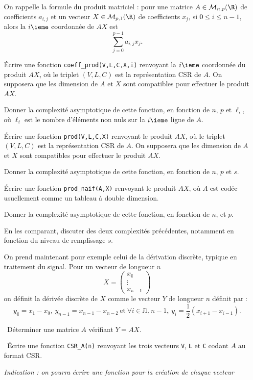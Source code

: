 \bigskip{}

On rappelle la formule du produit matriciel : pour une matrice $A \in \mathcal{M}_{n,p}(\R)$ de coefficients $a_{i,j}$ et un vecteur $X \in \mathcal{M}_{p,1}(\R)$ de coefficients $x_j$, si $0 \leq i \leq n-1$, alors la $i\ieme$ coordonnée de $AX$ est 
\begin{equation*}
    \sum_{j=0}^{p-1} a_{i,j} x_j.
\end{equation*}

\bigskip{}

\question{} Écrire une fonction \texttt{coeff\_prod(V,L,C,X,i)} renvoyant la $i\ieme$ coordonnée du produit $AX$, où le triplet $(V,L,C)$ est la représentation CSR de $A$. 
On supposera que les dimension de $A$ et $X$ sont compatibles pour effectuer le produit $AX$.

Donner la complexité asymptotique de cette fonction, en fonction de $n$, $p$ et $\ell_i$, où $\ell_i$ est le nombre d'éléments non nuls sur la $i\ieme$ ligne de $A$. 

\question{} Écrire une fonction \texttt{prod(V,L,C,X)} renvoyant le produit $AX$, où le triplet $(V,L,C)$ est la représentation CSR de $A$.  
On supposera que les dimension de $A$ et $X$ sont compatibles pour effectuer le produit $AX$.

Donner la complexité asymptotique de cette fonction, en fonction de $n$, $p$ et $s$. 

\question{} Écrire une fonction \texttt{prod\_naif(A,X)} renvoyant le produit $AX$, où $A$ est codée usuellement comme un tableau à double dimension.  

Donner la complexité asymptotique de cette fonction, en fonction de $n$, et $p$.

\question{} En les comparant, discuter des deux complexités précédentes, notamment en fonction du niveau de remplissage $s$. 

\bigskip{}

On prend maintenant pour exemple celui de la dérivation discrète, typique en traitement du signal. Pour un vecteur de longueur $n$
\begin{equation*}
    X = \begin{pmatrix} x_0 \\ \vdots \\ x_{n-1} \end{pmatrix}
\end{equation*}
on définit la dérivée discrète de $X$ comme le vecteur $Y$ de longueur $n$ définit par : 
\begin{equation*}
    y_0 = x_1-x_0,~y_{n-1} = x_{n-1} - x_{n-2}~\textrm{et}~\forall i \in \ii{1,n-1},~ y_i = \dfrac{1}{2}(x_{i+1}-x_{i-1}).
\end{equation*}

\question{} Déterminer une matrice $A$ vérifiant $Y = AX$. 

\question{} Écrire une fonction \texttt{CSR\_A(n)} renvoyant les trois vecteurs \texttt{V}, \texttt{L} et \texttt{C} codant $A$ au format CSR.

\emph{Indication : on pourra écrire une fonction pour la création de chaque vecteur}

